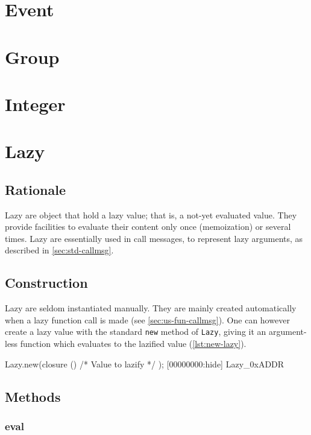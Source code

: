 \section{Event}



\section{Group}
\section{Integer}
\section{Lazy}

\subsection{Rationale}

Lazy are object that hold a lazy value; that is, a not-yet evaluated
value. They provide facilities to evaluate their content only once
(memoization) or several times. Lazy are essentially used in call
messages, to represent lazy arguments, as described in
\autoref{sec:std-callmsg}.

\subsection{Construction}

Lazy are seldom instantiated manually. They are mainly created
automatically when a lazy function call is made (see
\autoref{sec:us-fun-callmsg}). One can however create a lazy value with the
standard \lstinline|new| method of \lstinline|Lazy|, giving it an
argument-less function which evaluates to the lazified value
(\autoref{lst:new-lazy}).

\begin{urbiscript}[caption=Creating a lazy value, label=lst:new-lazy,
  float=\floatpos]
Lazy.new(closure () { /* Value to lazify */ });
[00000000:hide] Lazy_0xADDR
\end{urbiscript}

\subsection{Methods}
\subsubsection{eval}

